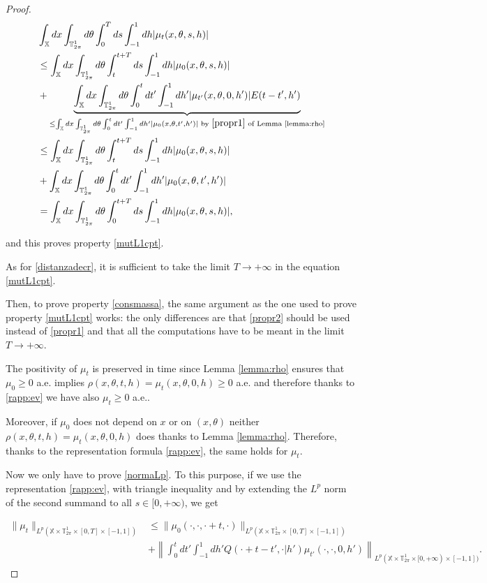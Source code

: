 \documentclass[a4paper,10pt,reqno]{amsart}
\numberwithin{equation}{subsection}
\numberwithin{figure}{subsection}
\begin{document}
\begin{proof}
\begin{align*}
&\int_{\mathbb{X}}dx\int_{\mathbb{T}^1_{2\pi}}d\theta\int_0^Tds\int_{-1}^1dh|\mu_t(x,\theta,s,h)|
\\
&\leq\int_{\mathbb{X}}dx\int_{\mathbb{T}^1_{2\pi}}d\theta\int_t^{t+T}ds\int_{-1}^1dh|\mu_0(x,\theta,s,h)|
\\
&+\underbrace{\int_{\mathbb{X}}dx\int_{\mathbb{T}^1_{2\pi}}d\theta\int_0^tdt'\int_{-1}^1dh' |\mu_{t'}(x,\theta,0,h')|E(t-t',h')}_{\leq\int_{\mathbb{X}}dx\int_{\mathbb{T}^1_{2\pi}}d\theta\int_0^tdt'\int_{-1}^1dh' |\mu_0(x,\theta,t',h')|\textrm{ by }\eqref{propr1}\textrm{ of Lemma \ref{lemma:rho}}}
\\
&\leq\int_{\mathbb{X}}dx\int_{\mathbb{T}^1_{2\pi}}d\theta\int_t^{t+T}ds\int_{-1}^1dh|\mu_0(x,\theta,s,h)|
\\
&+\int_{\mathbb{X}}dx\int_{\mathbb{T}^1_{2\pi}}d\theta\int_0^tdt'\int_{-1}^1dh' |\mu_0(x,\theta,t',h')|
\\
&=\int_{\mathbb{X}}dx\int_{\mathbb{T}^1_{2\pi}}d\theta\int_0^{t+T}ds\int_{-1}^1dh|\mu_0(x,\theta,s,h)|,
\end{align*}

and this proves property \eqref{mutL1cpt}.

As for \eqref{distanzadecr}, it is sufficient to take the limit $T\to+\infty$ in the equation \eqref{mutL1cpt}.

Then, to prove property \eqref{consmassa}, the same argument as the one used to prove property \eqref{mutL1cpt} works: the only differences are that \eqref{propr2} should be used instead of  \eqref{propr1} and that all the computations have to be meant in the limit $T\to+\infty$.

The positivity of $\mu_t$ is preserved in time since Lemma \ref{lemma:rho} ensures that $\mu_0\geq0$ a.e. implies $\rho(x,\theta,t,h)=\mu_t(x,\theta,0,h)\geq0$ a.e. and therefore thanks to \eqref{rapp:ev} we have also $\mu_t\geq0$ a.e..

Moreover, if $\mu_0$ does not depend on $x$ or on $(x,\theta)$ neither $\rho(x,\theta,t,h)=\mu_t(x,\theta,0,h)$ does thanks to Lemma \ref{lemma:rho}. Therefore, thanks to the representation formula \eqref{rapp:ev}, the same holds for $\mu_t$.

Now we only have to prove \eqref{normaLp}. To this purpose, if we use the representation \eqref{rapp:ev}, with triangle inequality and by extending the $L^p$ norm of the second summand to all $s\in[0,+\infty)$, we get

{\scriptsize\begin{align}
\label{normaLpstep1}\|\mu_t\|_{L^p(\mathbb{X}\times\mathbb{T}^1_{2\pi}\times[0,T]\times[-1,1])}&\leq\|\mu_0(\cdot,\cdot,\cdot+t,\cdot)\|_{L^p(\mathbb{X}\times\mathbb{T}^1_{2\pi}\times[0,T]\times[-1,1])}
\\
\label{normaLpstep2}&+\left\|\int_0^tdt'\int_{-1}^1dh'Q(\cdot+t-t',\cdot|h')\mu_{t'}(\cdot,\cdot,0,h')\right\|_{L^p(\mathbb{X}\times\mathbb{T}^1_{2\pi}\times[0,+\infty)\times[-1,1])}.
\end{align}}


\end{proof}
\end{document}
